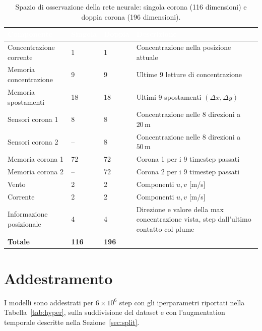 \begin{table}[H]
\centering
\renewcommand{\arraystretch}{1.25}
\small
\begin{tabular}{L{5.0cm} C{1.5cm} C{1.5cm} L{4.6cm}}
\toprule
{}
\textcolor{white}{\textbf{Componente}} &
\textcolor{white}{\textbf{Singola}} &
\textcolor{white}{\textbf{Doppia}} &
\textcolor{white}{\textbf{Descrizione}} \\
\midrule
Concentrazione corrente        & 1  & 1  & Concentrazione nella posizione attuale \\
Memoria concentrazione         & 9  & 9  & Ultime 9 letture di concentrazione \\
Memoria spostamenti            & 18 & 18 & Ultimi 9 spostamenti $(\Delta x, \Delta y)$ \\
Sensori corona 1               & 8  & 8  & Concentrazione nelle 8 direzioni a $20\,\text{m}$ \\
Sensori corona 2               & -- & 8  & Concentrazione nelle 8 direzioni a $50\,\text{m}$ \\
Memoria corona 1               & 72 & 72 & Corona 1 per i 9 timestep passati \\
Memoria corona 2               & -- & 72 & Corona 2 per i 9 timestep passati \\
Vento                          & 2  & 2  & Componenti $u, v$ [m/s] \\
Corrente                       & 2  & 2  & Componenti $u, v$ [m/s] \\
Informazione posizionale       & 4  & 4  & Direzione e valore della max concentrazione vista,
                                           step dall'ultimo contatto col plume \\
\midrule
\textbf{Totale}                & \textbf{116} & \textbf{196} & \\
\bottomrule
\end{tabular}
\caption{Spazio di osservazione della rete neurale: singola corona (116 dimensioni) e
         doppia corona (196 dimensioni).}
\label{tab:obs}
\end{table}

\section{Addestramento}
\label{sec:training}

I modelli sono addestrati per $6 \times 10^6$ step con gli iperparametri riportati nella
Tabella~\ref{tab:hyper}, sulla suddivisione del dataset e con l'augmentation temporale
descritte nella Sezione~\ref{sec:split}.

